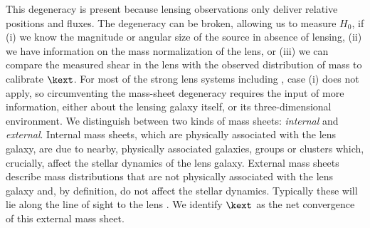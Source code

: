 \documentclass[useAMS,usenatbib]{mn2e}
\begin{document}
This degeneracy is present because lensing observations only deliver
relative positions and fluxes.  The degeneracy can be broken, allowing us to
measure $H_0$, if (i) we
know the magnitude or angular size of the source in absence of lensing,
(ii) we have information on
the mass normalization of the lens,
or (iii) we can compare the measured shear in the lens with the
observed distribution of mass to calibrate $\kext$.
For most of the strong lens systems including \ourlens, 
case (i) does not apply, so
circumventing the mass-sheet degeneracy requires the input of more
information, either about the lensing galaxy itself, or its three-dimensional
environment.
We distinguish between two kinds of mass sheets: \textit{internal}
and \textit{external}.  
%
Internal mass 
sheets, which are physically associated with the lens galaxy, are due
to nearby, physically associated galaxies, 
groups or clusters which, crucially, 
affect the stellar dynamics of the
lens galaxy. External mass sheets describe mass
distributions that are not physically associated with the
lens galaxy and, by definition, do not affect the stellar dynamics.  
Typically these will 
lie along the line of sight to the lens \citep{FassnachtEtal06}. 
We identify $\kext$ as the net convergence of this external mass sheet.
\end{document}

